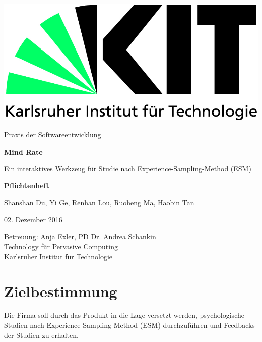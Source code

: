\documentclass[a4paper]{scrreprt}
\begin{document}
    \begin{flushright}
        \includegraphics[scale = 0.7]{kit-logo.jpg}\\[0.5cm]
    \end{flushright}
    \vspace*{2cm}

    \begin{center} \large

        Praxis der Softwareentwicklung
        \vspace * {1.5cm}

        \textbf{\huge Mind Rate}
		
        \vspace*{1cm}
		
        {\Large Ein interaktives Werkzeug f\"ur Studie nach Experience-Sampling-Method (ESM)}

        \vspace*{1cm}

        \textbf{\Large Pflichtenheft}
        \vspace*{2cm}

        Shanshan Du, Yi Ge, Renhan Lou, Ruoheng Ma, Haobin Tan
        \vspace*{1cm}

        02. Dezember 2016
        \vspace*{2.5cm}


        Betreuung: Anja Exler, PD Dr. Andrea Schankin\\[1cm]
        Technology f\"ur Pervasive Computing\\[0.5cm]
        Karlsruher Institut für Technologie
    \end{center}

    \tableofcontents

    \chapter{Zielbestimmung}
        Die Firma soll durch das Produkt in die Lage versetzt werden, psychologische Studien nach Experience-Sampling-Method (ESM) durchzuf\"uhren und Feedbacks der Studien zu erhalten.\\
\end{document}
